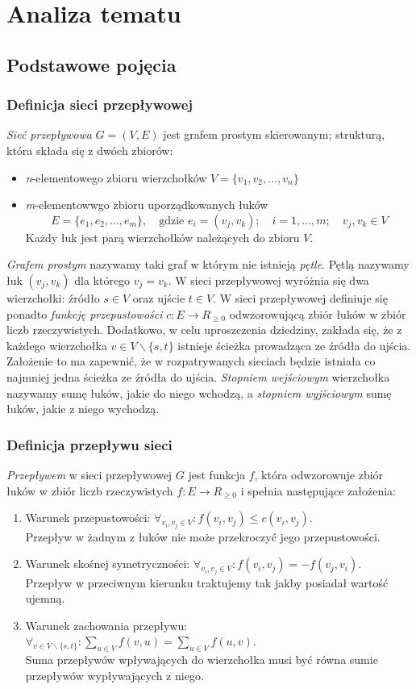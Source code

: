 \chapter{Analiza tematu}\label{ch:analiza}
\section{Podstawowe pojęcia}
\subsection{Definicja sieci przepływowej}\label{ssec:graphDef}
\emph{Sieć przepływowa} $ G=(V, E) $ jest grafem prostym skierowanym; strukturą, która składa się z dwóch zbiorów:
\begin{itemize}
	\item \textit{n}-elementowego zbioru wierzchołków $ V = \{v_1,v_2,...,v_n \}$
	\item \textit{m}-elementowwgo zbioru uporządkowanych łuków
	$$ E = \{e_1,e_2,...,e_m \},\quad \text{gdzie } e_i=(v_j,v_k);\quad i=1,...,m;\quad v_j,v_k\in V$$
	Każdy łuk jest parą wierzchołków należących do zbioru $ V $.
\end{itemize}
\emph{Grafem prostym} nazywamy taki graf w którym nie istnieją \emph{pętle}. Pętlą nazywamy łuk $ (v_j,v_k) $ dla którego $ v_j=v_k $. W sieci przepływowej wyróżnia się dwa wierzchołki: źródło $ s \in V $ oraz ujście $ t \in V $. W sieci przepływowej definiuje się ponadto \emph{funkcję przepustowości} $ c : E\rightarrow R_{\ge0}$ odwzorowującą zbiór łuków w zbiór liczb rzeczywistych. Dodatkowo, w celu uproszczenia dziedziny, zakłada się, że z każdego wierzchołka $ v\in V\backslash\{s, t\} $ istnieje ścieżka prowadząca ze źródła do ujścia. Założenie to ma zapewnić, że w rozpatrywanych sieciach będzie istniała co najmniej jedna ścieżka ze źródła do ujścia.
\emph{Stopniem wejściowym} wierzchołka nazywamy sumę łuków, jakie do niego wchodzą, a \emph{stopniem wyjściowym} sumę łuków, jakie z niego wychodzą.
\subsection{Definicja przepływu sieci}\label{ssec:flowDef}
\emph{Przepływem} w sieci przepływowej $ G $ jest funkcja $ f $, która odwzorowuje zbiór łuków w zbiór liczb rzeczywistych $ f : E \rightarrow R_{\ge0} $ i spełnia następujące założenia:
\begin{enumerate}
	\item Warunek przepustowości: $ \forall_{v_i, v_j\in V} : f(v_i, v_j) \le c(v_i, v_j) $.\\Przepływ w żadnym z łuków nie może przekroczyć jego przepustowości.
	\item Warunek skośnej symetryczności: $ \forall_{v_i, v_j\in V} : f(v_i, v_j) = -f(v_j, v_i) $.\\Przepływ w przeciwnym kierunku traktujemy tak jakby posiadał wartość ujemną.
	\item Warunek zachowania przepływu: $ \forall_{v\in V\backslash\{s, t\}} : \sum_{u\in V}f(v,u)=\sum_{u\in V}f(u,v) $.\\Suma przepływów wpływających do wierzchołka musi być równa sumie przepływów wypływających z niego.
\end{enumerate}
